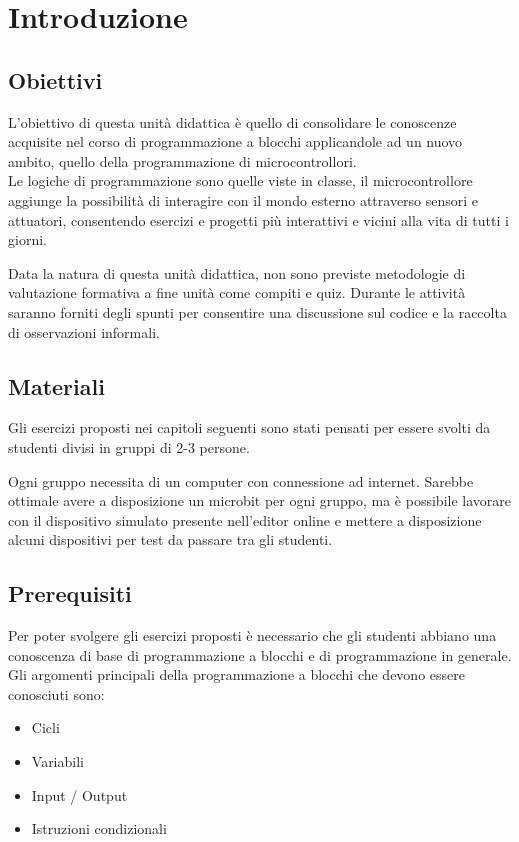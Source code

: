 \documentclass[../../docenti.tex]{subfiles}
\begin{document}
\section{Introduzione}

\subsection{Obiettivi}
L'obiettivo di questa unità didattica è quello di consolidare le conoscenze acquisite nel corso di programmazione a blocchi applicandole ad un nuovo ambito, quello della programmazione di microcontrollori.\\
Le logiche di programmazione sono quelle viste in classe, il microcontrollore aggiunge la possibilità di interagire con il mondo esterno attraverso sensori e attuatori, consentendo esercizi e progetti più interattivi e vicini alla vita di tutti i giorni. 

Data la natura di questa unità didattica, non sono previste metodologie di valutazione formativa a fine unità come compiti e quiz. Durante le attività saranno forniti degli spunti per consentire una discussione sul codice e la raccolta di osservazioni informali.

\subsection{Materiali}
Gli esercizi proposti nei capitoli seguenti sono stati pensati per essere svolti da studenti divisi in gruppi di 2-3 persone.

Ogni gruppo necessita di un computer con connessione ad internet. Sarebbe ottimale avere a disposizione un microbit per ogni gruppo, ma è possibile lavorare con il dispositivo simulato presente nell'editor online e mettere a disposizione alcuni dispositivi per test da passare tra gli studenti.

\subsection{Prerequisiti}
Per poter svolgere gli esercizi proposti è necessario che gli studenti abbiano una conoscenza di base di programmazione a blocchi e di programmazione in generale.\\
Gli argomenti principali della programmazione a blocchi che devono essere conosciuti sono:
\begin{itemize}
	\item Cicli
	\item Variabili
	\item Input / Output
	\item Istruzioni condizionali
\end{itemize}
\end{document}
